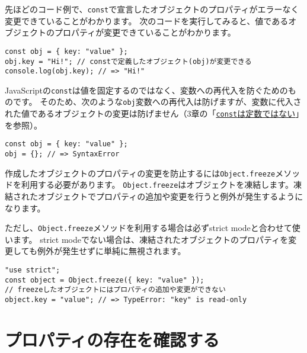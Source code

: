 \begin{tcolorbox}[float,title=constで定義したオブジェクトは変更可能]\label{const-and-object}

先ほどのコード例で、\texttt{const}で宣言したオブジェクトのプロパティがエラーなく変更できていることがわかります。
次のコードを実行してみると、値であるオブジェクトのプロパティが変更できていることがわかります。

\begin{lstlisting}
const obj = { key: "value" };
obj.key = "Hi!"; // constで定義したオブジェクト(obj)が変更できる
console.log(obj.key); // => "Hi!"
\end{lstlisting}

JavaScriptの\texttt{const}は値を固定するのではなく、変数への再代入を防ぐためのものです。
そのため、次のような\texttt{obj}変数への再代入は防げますが、変数に代入された値であるオブジェクトの変更は防げません（3章の「\hyperlink{const-is-not-constant}{\texttt{const}は定数ではない}」を参照）。

\begin{lstlisting}
const obj = { key: "value" };
obj = {}; // => SyntaxError
\end{lstlisting}

作成したオブジェクトのプロパティの変更を防止するには\texttt{Object.freeze}メソッドを利用する必要があります。
\texttt{Object.freeze}はオブジェクトを凍結します。凍結されたオブジェクトでプロパティの追加や変更を行うと例外が発生するようになります。

ただし、\texttt{Object.freeze}メソッドを利用する場合は必ずstrict
modeと合わせて使います。 strict
modeでない場合は、凍結されたオブジェクトのプロパティを変更しても例外が発生せずに単純に無視されます。

\begin{lstlisting}
"use strict";
const object = Object.freeze({ key: "value" });
// freezeしたオブジェクトにはプロパティの追加や変更ができない
object.key = "value"; // => TypeError: "key" is read-only
\end{lstlisting}
\end{tcolorbox}

\hypertarget{confirm-property}{%
\section{プロパティの存在を確認する}\label{confirm-property}}

